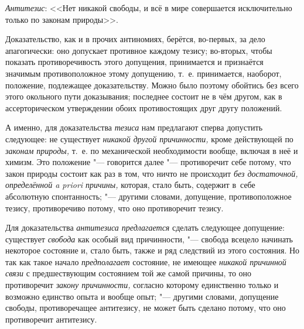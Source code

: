 {\em Антитезис}: <<Нет
никакой свободы, и всё в мире совершается исключительно только по законам
природы>>.

Доказательство, как и в прочих антиномиях, берётся, во-первых,
за дело апагогически: оно допускает противное каждому тезису; во-вторых,
чтобы показать противоречивость этого допущения, принимается и признаётся
значимым противоположное этому допущению, т.~е. принимается, наоборот,
положение, подлежащее доказательству. Можно было поэтому обойтись без всего
этого окольного пути доказывания; последнее состоит не в чём другом, как в
ассерторическом утверждении обоих противостоящих друг другу положений.

А именно, для доказательства
{\em тезиса} нам
предлагают сперва допустить следующее: не существует
{\em никакой другой причинности,}
кроме действующей по
{\em законам природы,}
т.~е. по механической необходимости вообще, включая в неё и
химизм. Это положение "--- говорится далее
"--- противоречит себе потому, что закон природы состоит как раз
в том, что ничто не происходит {\em без
достаточной, определённой a priori причины,} которая, стало
быть, содержит в~себе абсолютную спонтанность; "--- другими
словами, допущение, противоположное тезису, противоречиво потому, что оно
противоречит тезису.

Для доказательства
{\em антитезиса предлагается}
сделать следующее допущение: существует
{\em свобода} как особый
вид причинности, "--- свобода всецело начинать некоторое
состояние и, стало быть, также и ряд следствий из этого состояния. Но так
как такое начало {\em предполагает}
состояние, не имеющее
{\em никакой причинной связи}
с предшествующим состоянием той же самой причины, то оно
противоречит {\em закону причинности,}
согласно которому единственно только и возможно единство
опыта и вообще опыт; "--- другими словами, допущение свободы,
противоречащее антитезису, не может быть сделано потому, что оно
противоречит антитезису.

